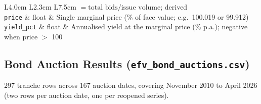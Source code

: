 \documentclass[12pt,a4paper]{article}
\begin{document}
\begin{longtable}{L{4.0cm} L{2.3cm} L{7.5cm}}
                                           $= \text{total bids} /
                                           \text{issue volume}$;
                                           derived \\[3pt]
  \texttt{price}                 & float & Single marginal price
                                           (\% of face value; e.g.\
                                           100.019 or 99.912) \\[3pt]
  \texttt{yield\_pct}            & float & Annualised yield at the marginal
                                           price (\% p.a.); negative when
                                           price $>$ 100 \\
\end{longtable}

\subsection{Bond Auction Results (\texttt{efv\_bond\_auctions.csv})}

297 tranche rows across 167 auction dates, covering November 2010 to April
2026 (two rows per auction date, one per reopened series).
\end{document}
